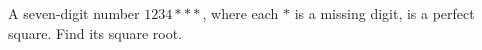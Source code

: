 A seven-digit number $1234\ast\ast\ast$, where each $\ast$ is a missing digit, is a perfect square. Find its square root.
